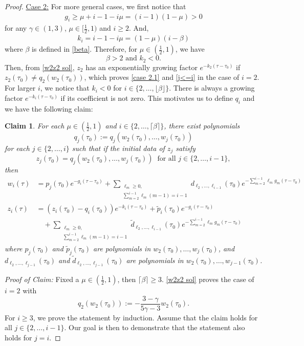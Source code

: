 \documentclass{article}
\newcommand{\ga}{\gamma}
\def\be{\begin{equation}}
\def\ee{\end{equation}}
\def\beqa{\begin{equation}\begin{aligned}}
\def\eeqa{\end{aligned}\end{equation}}
\numberwithin{equation}{section}
\newtheorem*{claim*}{Claim}
\begin{document}
\begin{proof}
    \underline{Case 2:} For more general cases, we first notice that 
    \beqa\label{gi>0}
        g_i \geq \mu+i-1-i\mu = (i-1)(1-\mu)>0
    \eeqa
    for any $\ga\in(1,3)$, $\mu\in[\frac12,1)$ and $i\geq 2$. And,
    \beqa
        k_i = i-1-i\mu = (1-\mu) (i -\beta)
    \eeqa
    where $\beta$ is defined in \eqref{beta}. Therefore, for $\mu\in(\frac12,1)$, we have 
    \[\beta> 2 \text{ and } k_2<0.\] 
    Then, from \eqref{w2z2 sol}, $z_2$ has an exponentially growing factor $e^{-k_2(\tau-\tau_0)}$ if $z_2(\tau_0)\neq q_2(w_2(\tau_0))$, which proves \eqref{case 2.1} and \eqref{j<=i} in the case of $i=2$. For larger $i$, we notice that $k_i<0$ for $i\in \{2, \dots,\lfloor \beta \rfloor\}$. There is always a growing factor $e^{-k_i(\tau-\tau_0)}$ if its coefficient is not zero. This motivates us to define $q_i$ and we  have the following claim:
    \begin{claim*}
        For each $\mu\in(\frac12,1)$ and $i\in \{2, \dots,\lceil \beta \rceil\}$, there exist polynomials
        \be
            q_j(\tau_0):=q_j(w_2(\tau_0),\dots, w_j(\tau_0))
        \ee
        for each $j\in\{2,\dots,i\}$ 
        such that 
        if the initial data of $z_j$ satisfy 
        \be\label{zj(tau0) constraint}
            z_j(\tau_0) = q_j(w_2(\tau_0),\dots, w_j(\tau_0))  \  \text{ for all }j\in\{2,\dots,i-1\}, 
        \ee
        then 
          \beqa\label{wjzj sol with condition}
               w_i(\tau) &= p_j(\tau_0) e^{-g_i(\tau-\tau_0)}
        +
        \sum_{\substack{\ell_m\geq 0,\\ \sum_{ m=2}^ { i-1} \ell_m (m-1) = i-1 }} d_{ \ell_2,\dots, \ell_{i-1}}(\tau_0)  
        e^{-\sum_{ m=2}^ { i-1}\ell_mg_m(\tau-\tau_0)}\\
       z_i(\tau)&=(z_i(\tau_0)-q_i(\tau_0))e^{-k_i(\tau-\tau_0)}+\tilde p_i(\tau_0)e^{-g_i(\tau-\tau_0)}\\&\quad + \sum_{\substack{\ell_m\geq 0,\\ \sum_{ m=2}^ { i-1} \ell_m (m-1) = i-1 }} \tilde d_{ \ell_2,\dots, \ell_{i-1}}(\tau_0)  
       e^{-\sum_{ m=2}^ { i-1}\ell_mg_m(\tau-\tau_0)}
    \eeqa
    where $p_j(\tau_0)$ and $\tilde p_j(\tau_0)$ are polynomials in $w_2(\tau_0),\dots, w_j(\tau_0)$, and $d_{ \ell_2,\dots, \ell_{j-1}}(\tau_0)$ and $\tilde d_{ \ell_2,\dots, \ell_{j-1}}(\tau_0)$ are polynomials in $w_2(\tau_0),\dots, w_{j-1}(\tau_0)$.
    \end{claim*} 
        \noindent\emph{Proof of Claim:}
            Fixed a $\mu\in(\frac12,1)$, then $\lceil\beta\rceil\geq 3$.  \eqref{w2z2 sol} proves the case of $i=2$ with 
            \be
                 q_2(w_2(\tau_0)) :=- \frac{3-\ga}{5\ga-3} w_2(\tau_0).
            \ee
        For $i\geq 3$, we prove the statement by induction. Assume that the claim holds for all $j\in\{2,\dots, i-1\}$. Our goal is then to demonstrate that the statement also holds for $j=i$. 
        

\end{proof}
\end{document}
